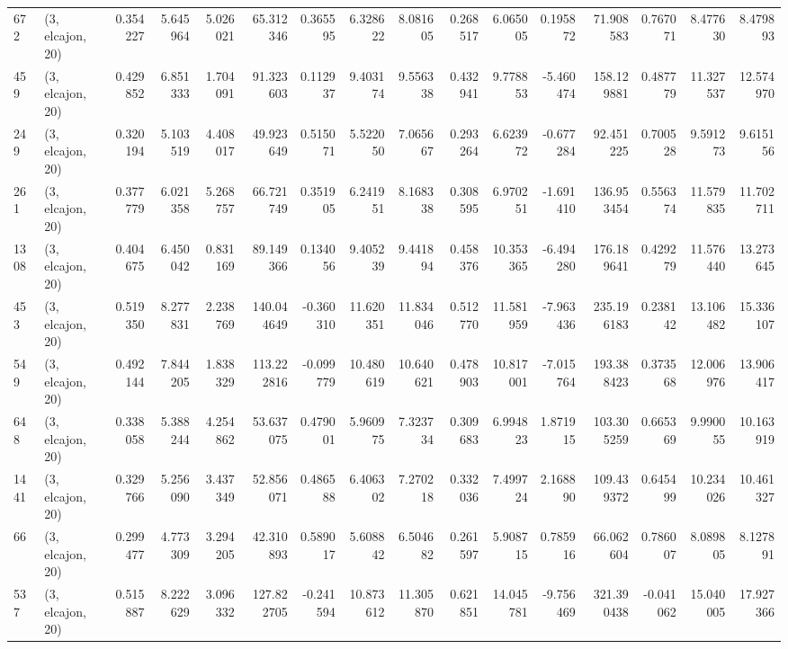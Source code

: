 \begin{tabular}{llrrrrrrrrrrrrrr}
672  &  (3, elcajon, 20) &   0.354227 &   5.645964 &   5.026021 &     65.312346 &    0.365595 &    6.328622 &    8.081605 &  0.268517 &   6.065005 &   0.195872 &    71.908583 &   0.767071 &   8.477630 &   8.479893 \\
459  &  (3, elcajon, 20) &   0.429852 &   6.851333 &   1.704091 &     91.323603 &    0.112937 &    9.403174 &    9.556338 &  0.432941 &   9.778853 &  -5.460474 &   158.129881 &   0.487779 &  11.327537 &  12.574970 \\
249  &  (3, elcajon, 20) &   0.320194 &   5.103519 &   4.408017 &     49.923649 &    0.515071 &    5.522050 &    7.065667 &  0.293264 &   6.623972 &  -0.677284 &    92.451225 &   0.700528 &   9.591273 &   9.615156 \\
261  &  (3, elcajon, 20) &   0.377779 &   6.021358 &   5.268757 &     66.721749 &    0.351905 &    6.241951 &    8.168338 &  0.308595 &   6.970251 &  -1.691410 &   136.953454 &   0.556374 &  11.579835 &  11.702711 \\
1308 &  (3, elcajon, 20) &   0.404675 &   6.450042 &   0.831169 &     89.149366 &    0.134056 &    9.405239 &    9.441894 &  0.458376 &  10.353365 &  -6.494280 &   176.189641 &   0.429279 &  11.576440 &  13.273645 \\
453  &  (3, elcajon, 20) &   0.519350 &   8.277831 &   2.238769 &    140.044649 &   -0.360310 &   11.620351 &   11.834046 &  0.512770 &  11.581959 &  -7.963436 &   235.196183 &   0.238142 &  13.106482 &  15.336107 \\
549  &  (3, elcajon, 20) &   0.492144 &   7.844205 &   1.838329 &    113.222816 &   -0.099779 &   10.480619 &   10.640621 &  0.478903 &  10.817001 &  -7.015764 &   193.388423 &   0.373568 &  12.006976 &  13.906417 \\
648  &  (3, elcajon, 20) &   0.338058 &   5.388244 &   4.254862 &     53.637075 &    0.479001 &    5.960975 &    7.323734 &  0.309683 &   6.994823 &   1.871915 &   103.305259 &   0.665369 &   9.990055 &  10.163919 \\
1441 &  (3, elcajon, 20) &   0.329766 &   5.256090 &   3.437349 &     52.856071 &    0.486588 &    6.406302 &    7.270218 &  0.332036 &   7.499724 &   2.168890 &   109.439372 &   0.645499 &  10.234026 &  10.461327 \\
66   &  (3, elcajon, 20) &   0.299477 &   4.773309 &   3.294205 &     42.310893 &    0.589017 &    5.608842 &    6.504682 &  0.261597 &   5.908715 &   0.785916 &    66.062604 &   0.786007 &   8.089805 &   8.127891 \\
537  &  (3, elcajon, 20) &   0.515887 &   8.222629 &   3.096332 &    127.822705 &   -0.241594 &   10.873612 &   11.305870 &  0.621851 &  14.045781 &  -9.756469 &   321.390438 &  -0.041062 &  15.040005 &  17.927366 \\

\end{tabular}
